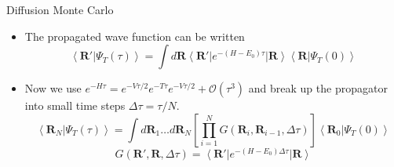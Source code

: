 \documentclass{beamer}
\newcommand{\ket}[1]{\left| #1 \right>}
\newcommand{\bra}[1]{\left< #1 \right|}
\newcommand{\braket}[2]{\left< #1 | #2 \right>}
\newcommand{\R}{\mathbf{R}}
\newcommand{\dt}{\Delta\tau}
\begin{document}
\begin{frame}{Diffusion Monte Carlo}
\begin{itemize}
   \item The propagated wave function can be written
   \begin{equation*}
      \braket{\R'}{\Psi_T(\tau)} = \int d\R \bra{\R'}e^{-(H-E_0)\tau}\ket{\R}\braket{\R}{\Psi_T(0)}
   \end{equation*}
   \item Now we use $e^{-H\tau}=e^{-V\tau/2}e^{-T\tau}e^{-V\tau/2}+\mathcal{O}(\tau^3)$ and break up the propagator into small time steps $\dt = \tau/N$.
   \begin{equation*}
      \braket{\R_N}{\Psi_T(\tau)} = \int d\R_1 \ldots d\R_N \left[\prod\limits_{i=1}^N G(\R_i,\R_{i-1},\Delta\tau)\right] \braket{\R_0}{\Psi_T(0)}
   \end{equation*}
   \begin{equation*}
      G(\R',\R,\Delta\tau) = \bra{\R'}e^{-(H-E_0)\Delta\tau}\ket{\R}
   \end{equation*}
\end{itemize}
\end{frame}
\end{document}
